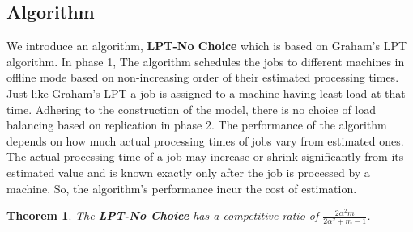 \documentclass[10pt, conference, compsocconf]{IEEEtran}
\newtheorem{theorem}{Theorem}[section]
\begin{document}
\subsection{Algorithm}

We introduce an algorithm, \textbf{LPT-No Choice} which is based on Graham's LPT algorithm. In phase 1, The algorithm schedules the jobs to different machines in offline mode based on non-increasing order of their estimated processing times. Just like Graham's LPT a
job is assigned to a machine having least load at that time. Adhering to the construction of the model, there is no choice of load balancing based on replication in phase 2. The performance of the algorithm depends on how much actual processing times of jobs vary from estimated ones. The actual processing time of a job may
increase or shrink significantly from its estimated value and is known exactly only after the job is processed by a machine. So, the algorithm's performance incur the cost of estimation.

\begin{theorem}
The \textbf{LPT-No Choice} has a competitive ratio of $ \frac{2\alpha^{2}m}{2\alpha^{2}+ m-1}$.
\end{theorem} 
\end{document}
